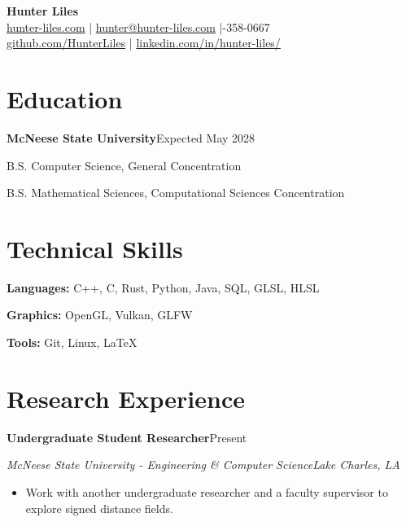 \documentclass[11pt,letterpaper]{article}
\newcommand{\entry}[4]{%
  \textbf{#1}\hfill #2\par
  \textit{#3}\hfill \textit{#4}\par
}
\begin{document}
\begin{center}
	{\LARGE\bfseries Hunter Liles}\\[3pt]
	\href{https://hunter-liles.com}{hunter-liles.com} \enspace|\enspace
	\href{mailto:hunter@hunter-liles.com}{hunter@hunter-liles.com} \enspace|-358-0667\\[2pt]
	\href{https://github.com/HunterLiles}{github.com/HunterLiles} \enspace|\enspace
	\href{https://www.linkedin.com/in/hunter-liles/}{linkedin.com/in/hunter-liles/}
\end{center}
\vspace{-9pt}

\section{Education}
\textbf{McNeese State University}\hfill Expected May 2028\par
B.S. Computer Science, General Concentration\par
B.S. Mathematical Sciences, Computational Sciences Concentration\par

\section{Technical Skills}
\textbf{Languages:} C++, C, Rust, Python, Java, SQL, GLSL, HLSL\par
\textbf{Graphics:} OpenGL, Vulkan, GLFW\par
\textbf{Tools:} Git, Linux, LaTeX\par

\section{Research Experience}
\entry{Undergraduate Student Researcher}{Present}{McNeese State University - Engineering \& Computer Science}{Lake Charles, LA}
\begin{itemize}
	\item Work with another undergraduate researcher and a faculty supervisor to explore signed distance fields.
\end{itemize}
\end{document}
